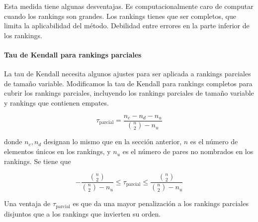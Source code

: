  Esta medida tiene algunas desventajas. Es computacionalmente caro de computar cuando los rankings son grandes. Los rankings tienes que ser completos, que limita la aplicabilidad del método. Debilidad entre errores en la parte inferior de los rankings.
 
 \paragraph{Tau de Kendall para rankings parciales}
 
 La tau de Kendall necesita algunos ajustes para ser aplicada a rankings parciales de tamaño variable. Modificamos la tau de Kendall para rankings completos para cubrir los rankings parciales, incluyendo los rankings parciales de tamaño variable y rankings que contienen empates.
 
 \[ \tau_{\text{parcial}} = \dfrac{n_c - n_d - n_u}{\binom{n}{2} - n_u} \]
 
 donde $n_c, n_d$ designan lo mismo que en la sección anterior, $n$ es el número de elementos únicos en los rankings, y $n_u$ es el número de pares no nombrados en los rankings. Se tiene que 
 
 \[ -\dfrac{\binom{n}{2}}{\binom{n}{2} - n_u} \leq \tau_{\text{parcial}} \leq \dfrac{\binom{n}{2}}{\binom{n}{2} - n_u} \]
 
 Una ventaja de $\tau_{\text{parcial}}$ es que da una mayor penalización a los rankings parciales disjuntos que a los rankings que invierten su orden.